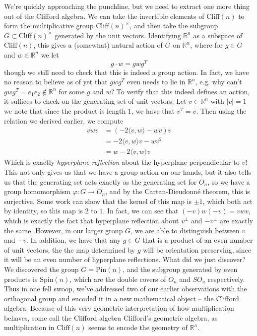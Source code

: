 \documentclass{article}
\newcommand{\R}{\mathbb{R}}
\begin{document}
We're quickly approaching the punchline, but we need to extract one more thing out of the Clifford algebra. We can take the invertible elements of $\mathrm{Cliff}(n)$ to form the multiplicative group $\mathrm{Cliff}(n)^\times$, and then take the subgroup $G \subset \mathrm{Cliff}(n)^\times$ generated by the unit vectors. Identifying $\R^n$ as a subspace of $\mathrm{Cliff}(n)$, this gives a (somewhat) natural action of $G$ on $\R^n$, where for $g \in G$ and $w \in \R^n$ we let 
$$g\cdot w = gwg^T $$
though we still need to check that this is indeed a group action. In fact, we have no reason to believe as of yet that $gwg^T$ even needs to lie in $\R^n$, e.g. why can't $gwg^T = e_1e_2 \notin \R^n$ for some $g$ and $w$? To verify that this indeed defines an action, it suffices to check on the generating set of unit vectors. Let $v \in \R^n$ with $|v| = 1$ we note that since the product is length $1$, we have that $v^T = v$. Then using the relation we derived earlier, we compute
\begin{align*}
vwv &= (-2 \langle v,w \rangle - wv)v \\
&= -2\langle v,w \rangle v -wv^2 \\
&= w - 2\langle v,w \rangle v
\end{align*}
Which is exactly \emph{hyperplane reflection} about the hyperplane perpendicular to $v$! This not only gives us that we have a group action on our hands, but it also tells us that the generating set acts exactly as the generating set for $O_n$, so we have a group homomorphism $\varphi : G \to O_n$, and by the Cartan-Dieudonn\'e theorem, this is surjective. Some work can show that the kernel of this map is $\pm 1$, which both act by identity, so this map is $2$ to $1$. In fact, we can see that $(-v)w(-v) = vwv$, which is exactly the fact that hyperplane reflection about $v^\perp$ and $-v^\perp$ are exactly the same. However, in our larger group $G$, we are able to distinguish between $v$ and $-v$. In addition, we have that any $g \in G$ that is a product of an even number of unit vectors, the the map determined by $g$ will be orientation preserving, since it will be an even number of hyperplane reflections. What did we just discover? We discovered the group $G = \mathrm{Pin}(n)$, and the subgroup generated by even products is $\mathrm{Spin}(n)$, which are the double covers of $O_n$ and $SO_n$ respectively. Thus in one fell swoop, we've addressed two of our earlier observations with the orthogonal group and encoded it in a new mathematical object -- the Clifford algebra. Because of this very geometric interpretation of how multiplication behaves, some call the Clifford algebra Clifford's geometric algebra, as multiplication in $\mathrm{Cliff}(n)$ seems to encode the geometry of $\R^n$.
\end{document}
